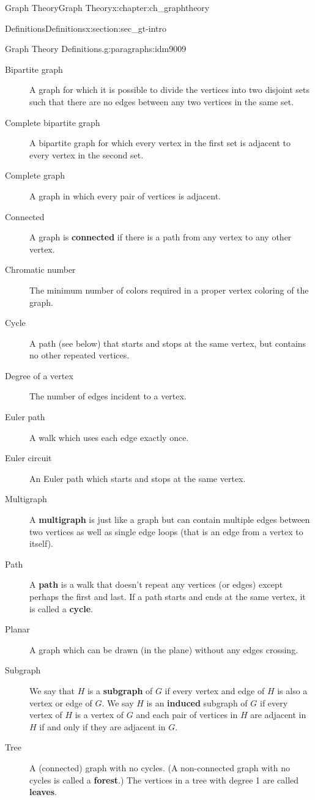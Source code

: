 \documentclass[oneside,10pt,]{book}
\newcommand{\terminology}[1]{\textbf{#1}}
\numberwithin{equation}{chapter}
\begin{document}
\begin{chapterptx}{Graph Theory}{}{Graph Theory}{}{}{x:chapter:ch_graphtheory}
\begin{sectionptx}{Definitions}{}{Definitions}{}{}{x:section:sec_gt-intro}
\begin{paragraphs}{Graph Theory Definitions.}{g:paragraphs:idm9009}
\begin{description}
\item[{Bipartite graph}] A graph for which it is possible to divide the vertices into two disjoint sets such that there are no edges between any two vertices in the same set.%
\item[{Complete bipartite graph}]A bipartite graph for which every vertex in the first set is adjacent to every vertex in the second set.%
\item[{Complete graph}] A graph in which every pair of vertices is adjacent.%
\item[{Connected}] A graph is \terminology{connected} if there is a path from any vertex to any other vertex.%
\item[{Chromatic number}] The minimum number of colors required in a proper vertex coloring of the graph.%
\item[{Cycle}] A path (see below) that starts and stops at the same vertex, but contains no other repeated vertices.%
\item[{Degree of a vertex}] The number of edges incident to a vertex.%
\item[{Euler path}]A walk which uses each edge exactly once.%
\item[{Euler circuit}] An Euler path which starts and stops at the same vertex.%
\item[{Multigraph}] A \terminology{multigraph} is just like a graph but can contain multiple edges between two vertices as well as single edge loops (that is an edge from a vertex to itself).%
\item[{Path}]A \terminology{path} is a walk that doesn't repeat any vertices (or edges) except perhaps the first and last.  If a path starts and ends at the same vertex, it is called a \terminology{cycle}.%
\item[{Planar}] A graph which can be drawn (in the plane) without any edges crossing.%
\item[{Subgraph}] We say that \(H\) is a \terminology{subgraph} of \(G\) if every vertex and edge of \(H\) is also a vertex or edge of \(G\). We say \(H\) is an \terminology{induced} subgraph of \(G\) if every vertex of \(H\) is a vertex of \(G\) and each pair of vertices in \(H\) are adjacent in \(H\) if and only if they are adjacent in \(G\).%
\item[{Tree}] A (connected) graph with no cycles. (A non-connected graph with no cycles is called a \terminology{forest}.) The vertices in a tree with degree 1 are called \terminology{leaves}.%

\end{description}
\end{paragraphs}
\end{sectionptx}
\end{chapterptx}
\end{document}
